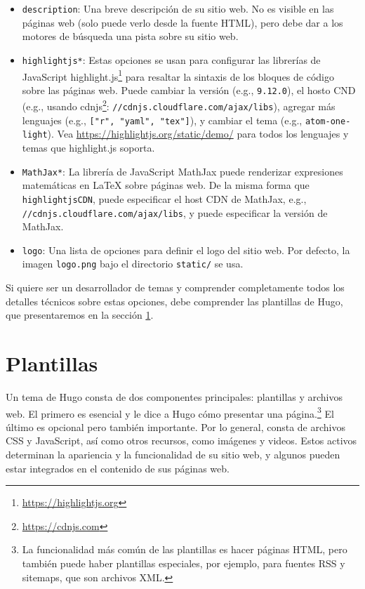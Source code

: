 \documentclass[12pt,]{krantz}
\renewcommand{\href}[2]{#2\footnote{\url{#1}}}
\theoremstyle{definition}
\theoremstyle{definition}
\theoremstyle{definition}
\theoremstyle{remark}
\begin{document}
\begin{itemize}
  \begin{itemize}
  \item
    \texttt{description}: Una breve descripción de su sitio web. No es
    visible en las páginas web (solo puede verlo desde la fuente HTML),
    pero debe dar a los motores de búsqueda una pista sobre su sitio
    web.
  \item
    \texttt{highlightjs*}: Estas opciones se usan para configurar las
    librerías de JavaScript
    \href{https://highlightjs.org}{highlight.js} para resaltar la
    sintaxis de los bloques de código sobre las páginas web. Puede
    cambiar la versión (e.g., \texttt{9.12.0}), el hosto CND (e.g.,
    usando \href{https://cdnjs.com}{cdnjs}:
    \texttt{//cdnjs.cloudflare.com/ajax/libs}), agregar más lenguajes
    (e.g., \texttt{{[}"r",\ "yaml",\ "tex"{]}}), y cambiar el tema
    (e.g., \texttt{atom-one-light}). Vea
    \url{https://highlightjs.org/static/demo/} para todos los lenguajes
    y temas que highlight.js soporta.
  \item
    \texttt{MathJax*}: La librería de JavaScript MathJax
    puede renderizar expresiones matemáticas en LaTeX sobre páginas web.
    De la misma forma que \texttt{highlightjsCDN}, puede especificar el
    host CDN de MathJax, e.g.,
    \texttt{//cdnjs.cloudflare.com/ajax/libs}, y puede especificar la
    versión de MathJax.
  \item
    \texttt{logo}: Una lista de opciones para definir el
    logo del sitio web. Por defecto, la imagen
    \texttt{logo.png} bajo el directorio \texttt{static/} se usa.
  \end{itemize}
\end{itemize}

Si quiere ser un desarrollador de temas y comprender completamente todos
los detalles técnicos sobre estas opciones, debe comprender las
plantillas de Hugo, que presentaremos en la sección \ref{plantillas}.

\hypertarget{plantillas}{%
\section{Plantillas}\label{plantillas}}

Un tema de Hugo consta de dos componentes principales:
plantillas y archivos web. El primero es esencial y le
dice a Hugo cómo presentar una página.\footnote{La funcionalidad más
  común de las plantillas es hacer páginas HTML, pero también puede
  haber plantillas especiales, por ejemplo, para fuentes RSS y sitemaps,
  que son archivos XML.} El último es opcional pero también importante.
Por lo general, consta de archivos CSS y JavaScript, así como otros
recursos, como imágenes y videos. Estos activos determinan la apariencia
y la funcionalidad de su sitio web, y algunos pueden estar integrados en
el contenido de sus páginas web.
\end{document}
